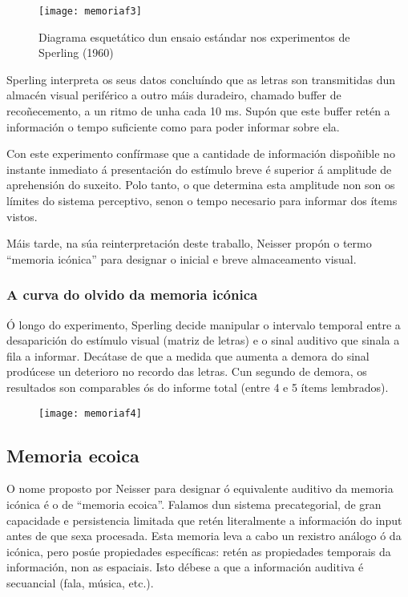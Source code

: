 \documentclass[a4paper,11pt]{article}
\begin{document}
\begin{figure}[h!]
	\centering
	\texttt{[image: memoriaf3]}
	\caption{Diagrama esquetático dun ensaio estándar nos experimentos de Sperling (1960)}
\end{figure}

Sperling interpreta os seus datos concluíndo que as letras son transmitidas dun almacén visual periférico a outro máis duradeiro, chamado buffer de recoñecemento, a un ritmo de unha cada 10 ms. Supón que este buffer retén a información o tempo suficiente como para poder informar sobre ela. 

Con este experimento confírmase que a cantidade de información dispoñible no instante inmediato á presentación do estímulo breve é superior á amplitude de aprehensión do suxeito. Polo tanto, o que determina esta amplitude non son os límites do sistema perceptivo, senon o tempo necesario para informar dos ítems vistos.

Máis tarde, na súa reinterpretación deste traballo, Neisser propón o termo ``memoria icónica'' para designar o inicial e breve almaceamento visual.


\subsubsection{A curva do olvido da memoria icónica}
Ó longo do experimento, Sperling decide manipular o intervalo temporal entre a desaparición do estímulo visual (matriz de letras) e o sinal auditivo que sinala a fila a informar. Decátase de que a medida que aumenta a demora do sinal prodúcese un deterioro no recordo das letras. Cun segundo de demora, os resultados son comparables ós do informe total (entre 4 e 5 ítems lembrados).

\begin{figure}[h!]
	\centering
	\texttt{[image: memoriaf4]}
\end{figure}

\subsection{Memoria ecoica}
O nome proposto por Neisser para designar ó equivalente auditivo da memoria icónica é o de ``memoria ecoica''. Falamos dun sistema precategorial, de gran capacidade e persistencia limitada que retén literalmente a información do input antes de que sexa procesada. Esta memoria leva a cabo un rexistro análogo ó da icónica, pero posúe propiedades específicas: retén as propiedades temporais da información, non as espaciais. Isto débese a que a información auditiva é secuancial (fala, música, etc.). 
\end{document}

